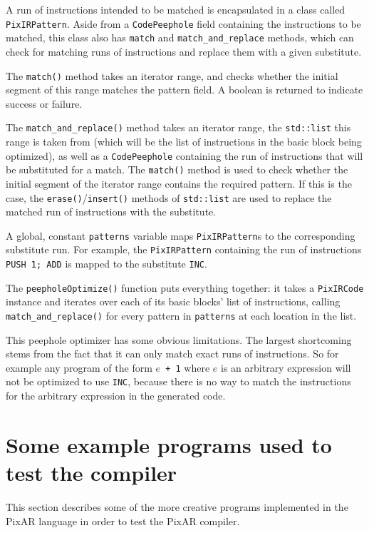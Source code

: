 \documentclass[11pt,a4paper]{scrartcl}
\begin{document}
A run of instructions intended to be matched is encapsulated in a class called \verb|PixIRPattern|. Aside from a \verb|CodePeephole| field containing the instructions to be matched, this class also has \verb|match| and \verb|match_and_replace| methods, which can check for matching runs of instructions and replace them with a given substitute.

The \verb|match()| method takes an iterator range, and checks whether the initial segment of this range matches the pattern field. A boolean is returned to indicate success or failure.

The \verb|match_and_replace()| method takes an iterator range, the \verb|std::list| this range is taken from (which will be the list of instructions in the basic block being optimized), as well as a \verb|CodePeephole| containing the run of instructions that will be substituted for a match. The \verb|match()| method is used to check whether the initial segment of the iterator range contains the required pattern. If this is the case, the \verb|erase()|/\verb|insert()| methods of \verb|std::list| are used to replace the matched run of instructions with the substitute.

A global, constant \verb|patterns| variable maps \verb|PixIRPattern|s to the corresponding substitute run. For example, the \verb|PixIRPattern| containing the run of instructions \verb|PUSH 1; ADD| is mapped to the substitute \verb|INC|.

The \verb|peepholeOptimize()| function puts everything together: it takes a \verb|PixIRCode| instance and iterates over each of its basic blocks' list of instructions, calling \verb|match_and_replace()| for every pattern in \verb|patterns| at each location in the list.

This peephole optimizer has some obvious limitations. The largest shortcoming stems from the fact that it can only match exact runs of instructions. So for example any program of the form $e$\verb| + 1| where $e$ is an arbitrary expression will not be optimized to use \verb|INC|, because there is no way to match the instructions for the arbitrary expression in the generated code.

\newpage

\section{Some example programs used to test the compiler}

This section describes some of the more creative programs implemented in the PixAR language in order to test the PixAR compiler.
\end{document}
